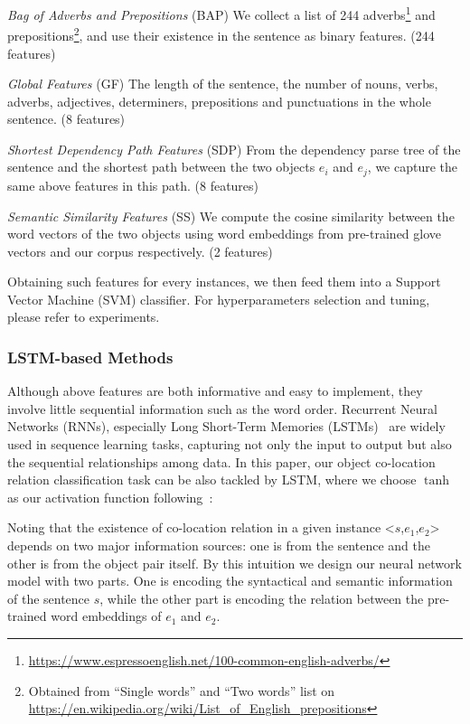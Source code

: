 \noindent
\textit{Bag of Adverbs and Prepositions} (BAP)
We collect a list of 244 adverbs\footnote{\url{https://www.espressoenglish.net/100-common-english-adverbs/}} and prepositions\footnote{Obtained from ``Single words'' and ``Two words'' list on \url{https://en.wikipedia.org/wiki/List_of_English_prepositions}}, 
and use their existence in the sentence as binary features. (244 features)

\noindent
\textit{Global Features} (GF)
The length of the sentence, the number of nouns, verbs, adverbs, adjectives, determiners, prepositions and punctuations in the whole sentence. (8 features)

\noindent
\textit{Shortest Dependency Path Features} (SDP)
From the dependency parse
tree of the sentence and the shortest path between the two objects 
$e_i$ and $e_j$, we capture the same above features in this path. (8 features)

\noindent
\textit{Semantic Similarity Features} (SS)
We compute the cosine similarity between the word vectors of the two objects using word embeddings from pre-trained glove vectors and our corpus respectively. (2 features)

Obtaining such features for every instances, 
we then feed them into a Support Vector Machine (SVM) classifier. 
For hyperparameters selection and tuning, please refer 
to experiments. 

\subsubsection{LSTM-based Methods}
Although above features are both informative and easy to implement, 
they involve little sequential information such as the word order.
Recurrent Neural Networks (RNNs), 
especially Long Short-Term Memories (LSTMs)~\cite{hochreiter1997long} are widely used in sequence learning tasks,
capturing not only the input to output but also the sequential 
relationships among data.
In this paper, our object co-location relation classification task can be also tackled by LSTM, where we choose $\tanh$ as our activation function following~\cite{xu2015classifying}:

Noting that the existence of co-location relation in 
a given instance \textless $s$,$e_1$,$e_2$\textgreater~ depends 
on two major information sources: one is from the sentence 
and the other is from the object pair itself.
By this intuition we design our neural network model with two parts.
One is encoding the syntactical and semantic information of the sentence $s$, while the other part is encoding the relation between the pre-trained word embeddings of $e_1$ and $e_2$.

